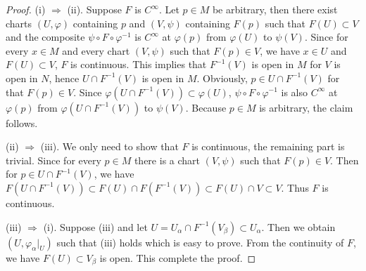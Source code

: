 \begin{proof}
    (i) $\Rightarrow$ (ii). Suppose $F$ is $C^\infty$. Let $p \in M$ be arbitrary, then there exist charts $(U, \varphi)$ containing $p$ and $(V, \psi)$ containing $F(p)$ such that $F(U) \subset V$ and the composite $\psi \circ F \circ \varphi^{-1}$ is $C^\infty$ at $\varphi(p)$ from $\varphi(U)$ to $\psi(V)$. Since for every $x \in M$ and every chart $(V, \psi)$ such that $F(p) \in V$, we have $x \in U$ and $F(U) \subset V$, $F$ is continuous. This implies that $F^{-1}(V)$ is open in $M$ for $V$ is open in $N$, hence $U \cap F^{-1}(V)$ is open in $M$. Obviously, $p \in U \cap F^{-1}(V)$ for that $F(p) \in V$. Since $\varphi(U \cap F^{-1}(V)) \subset \varphi(U)$, $\psi \circ F \circ \varphi^{-1}$ is also $C^\infty$ at $\varphi(p)$ from $\varphi(U \cap F^{-1}(V))$ to $\psi(V)$. Because $p \in M$ is arbitrary, the claim follows.

    (ii) $\Rightarrow$ (iii).  We only need to show that $F$ is continuous, the remaining part is trivial. Since for every $p \in M$ there is a chart $(V, \psi)$ such that $F(p) \in V$. Then for $p \in U \cap F^{-1}(V)$, we have $F(U \cap F^{-1}(V)) \subset F(U) \cap F(F^{-1}(V)) \subset F(U) \cap V \subset V$. Thus $F$ is continuous. 

    (iii) $\Rightarrow$ (i). Suppose (iii) and let $U = U_\alpha \cap F^{-1}(V_\beta) \subset U_\alpha$. Then we obtain $(U, \varphi_\alpha|_U)$ such that (iii) holds which is easy to prove. From the continuity of $F$, we have $F(U) \subset V_\beta$ is open. This complete the proof.
    \begin{comment}
    (ii) $\Rightarrow$ (iv). Let $(\widetilde{U}, \widetilde{\varphi})$ and $(\widetilde{V}, \widetilde{\psi})$ be any charts on $M$ and $N$, respectively, such that $\widetilde{U} \cap F^{-1}(\widetilde{V}) \neq \emptyset$. If $p \in \widetilde{U} \cap F^{-1}(\widetilde{V})$. by assumption, there are charts $(U, \varphi)$ containing $p$ and $(V, \psi)$ containing $F(p)$ such that  $\psi \circ F \circ \varphi^{-1}$ is $C^\infty$ from $\varphi(U \cap F^{-1}(V))$ to $\psi(V)$. By the $C^\infty$-compatibility of charts in a differentiable structure, $\varphi \circ \widetilde{\varphi}^{-1} : \widetilde{\varphi}(U \cap \widetilde{U}) \to \varphi(U \cap \widetilde{U})$ and $\widetilde{\psi} \circ \psi^{-1} : \psi(V \cap \widetilde{V}) \to \widetilde{\psi}(V \cap \widetilde{V})$ are $C^\infty$. Thus,
    \begin{align*}
        \widetilde{\psi} \circ F \circ \widetilde{\varphi}^{-1}
        = (\widetilde{\psi} \circ \psi^{-1}) \circ
        (\psi \circ F \circ \varphi^{-1}) \circ
        (\varphi \circ \widetilde{\varphi}^{-1})
    \end{align*}
    is $C^\infty$ at $\widetilde{\varphi}(p)$. Since $p \in \widetilde{U} \cap F^{-1}(\widetilde{V})$ is arbitrary, so does $\widetilde{\varphi}(p) \in \widetilde{\varphi}(\widetilde{U} \cap F^{-1}(\widetilde{V}))$, we have $\widetilde{\psi} \circ F \circ \widetilde{\varphi}^{-1}$ is $C^\infty$ from $\widetilde{\varphi}(\widetilde{U} \cap F^{-1}(\widetilde{V}))$ to $\widetilde{\psi}(\widetilde{V})$.
    \end{comment}
\end{proof}

